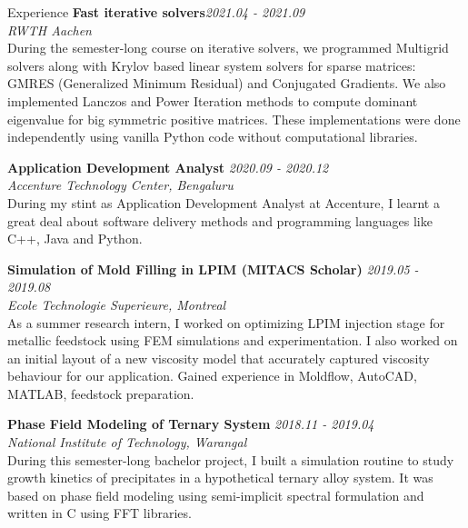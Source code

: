 \documentclass{resume} %
\begin{document}
\begin{rSection}{Experience}
{\bf Fast iterative solvers}\hfill {\em 2021.04 - 2021.09}\\
{\em RWTH Aachen}\\
During the semester-long course on iterative solvers, we programmed Multigrid solvers along with Krylov based linear system solvers for sparse matrices: GMRES (Generalized Minimum Residual) and Conjugated Gradients. We also implemented Lanczos and Power Iteration methods to compute dominant eigenvalue for big symmetric positive matrices. These implementations were done independently using vanilla Python code without computational libraries.

{\bf Application Development Analyst} \hfill {\em 2020.09 - 2020.12}\\
{\em Accenture Technology Center, Bengaluru}\\
During my stint as Application Development Analyst at Accenture, I learnt a great deal about software delivery methods and programming languages like C++, Java and Python. 

{\bf Simulation of Mold Filling in LPIM (MITACS Scholar)} \hfill {\em 2019.05 - 2019.08}\\
{\em Ecole Technologie Superieure, Montreal}\\
As a summer research intern, I worked on optimizing LPIM injection stage for metallic feedstock using FEM simulations and experimentation. I also worked on an initial layout of a new viscosity model that accurately captured viscosity behaviour for our application. Gained experience in Moldflow, AutoCAD, MATLAB, feedstock preparation.

{\bf Phase Field Modeling of Ternary System} \hfill {\em 2018.11 - 2019.04}\\
{\em National Institute of Technology, Warangal}\\
During this semester-long bachelor project, I built a simulation routine to study growth kinetics of precipitates in a hypothetical ternary alloy system. It was based on phase field modeling using semi-implicit spectral formulation and written in C using FFT libraries.



\end{rSection}
\end{document}
